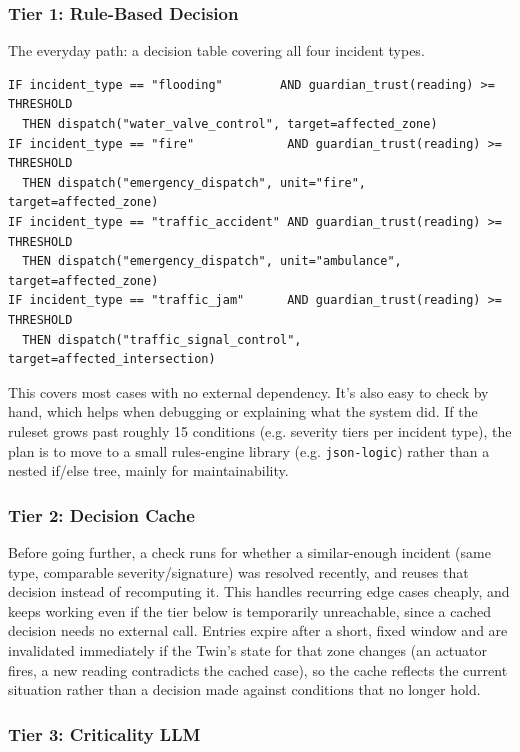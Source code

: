 \documentclass[10pt,letterpaper]{article}
\begin{document}
\subsubsection*{Tier 1: Rule-Based Decision}

The everyday path: a decision table covering all four incident types.

\begin{verbatim}
IF incident_type == "flooding"        AND guardian_trust(reading) >= THRESHOLD
  THEN dispatch("water_valve_control", target=affected_zone)
IF incident_type == "fire"             AND guardian_trust(reading) >= THRESHOLD
  THEN dispatch("emergency_dispatch", unit="fire", target=affected_zone)
IF incident_type == "traffic_accident" AND guardian_trust(reading) >= THRESHOLD
  THEN dispatch("emergency_dispatch", unit="ambulance", target=affected_zone)
IF incident_type == "traffic_jam"      AND guardian_trust(reading) >= THRESHOLD
  THEN dispatch("traffic_signal_control", target=affected_intersection)
\end{verbatim}

This covers most cases with no external dependency. It's also easy to check by hand, which helps when debugging or explaining what the system did. If the ruleset grows past roughly 15 conditions (e.g. severity tiers per incident type), the plan is to move to a small rules-engine library (e.g. \texttt{json-logic}) rather than a nested if/else tree, mainly for maintainability.

\subsubsection*{Tier 2: Decision Cache}

Before going further, a check runs for whether a similar-enough incident (same type, comparable severity/signature) was resolved recently, and reuses that decision instead of recomputing it. This handles recurring edge cases cheaply, and keeps working even if the tier below is temporarily unreachable, since a cached decision needs no external call. Entries expire after a short, fixed window and are invalidated immediately if the Twin's state for that zone changes (an actuator fires, a new reading contradicts the cached case), so the cache reflects the current situation rather than a decision made against conditions that no longer hold.

\subsubsection*{Tier 3: Criticality LLM}
\end{document}
